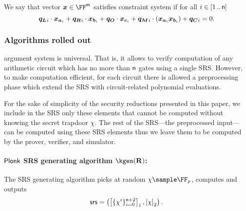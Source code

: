 \documentclass[runningheads,11pt]{llncs}
\begin{document}
We say that vector $\vx \in \FF^\noofw$ satisfies constraint system if for all $i
\in [1 \, .. \, \mathsf{n}]$
\[
  \vql_i \cdot \vx_{\va_i} + \vqr_i \cdot \vx_{\vb_i} + \vqo \cdot \vx_{\vc_i} +
  \vqm_i \cdot (\vx_{\va_i} \vx_{\vb_i}) + \vqc_i = 0. 
\]

\subsubsection{Algorithms rolled out}
\label{sec:plonk_explained}
\plonk{} argument system is universal. That is, it allows to verify computation
of any arithmetic circuit which has no more than $\mathsf{n}$
gates using a single SRS. However, to make computation efficient, for each
circuit there is allowed a preprocessing phase which extend the SRS with
circuit-related polynomial evaluations.

For the sake of simplicity of the security reductions presented in this paper, we
include in the SRS only these elements that cannot be computed without knowing
the secret trapdoor $\chi$. The rest of the SRS---the preprocessed input---can
be computed using these SRS elements thus we leave them to be computed by the
prover, verifier, and simulator.

\paragraph{$\textnormal{\textsf{Plonk}}$ SRS generating algorithm $\kgen(\REL)$:}
The SRS generating algorithm picks at random $\chi \sample \FF_p$, computes
and outputs
\[
	\mathsf{srs} = \left(\left[\{\chi^i\}_{i = 0}^{\mathsf{n} + 2}\right]_{1},
	\left[\chi\right]_{2} \right).
\]
\end{document}
